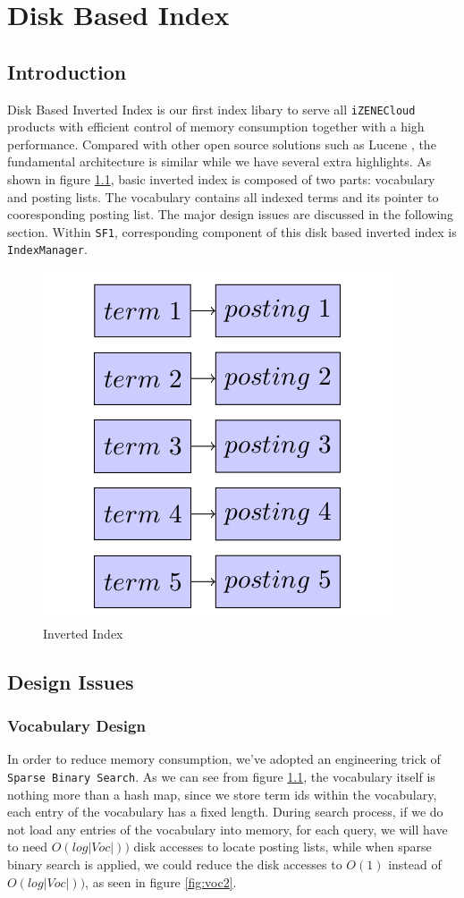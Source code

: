 \chapter{Disk Based Index}
\section{Introduction}
Disk Based Inverted Index is our first index libary to serve all \texttt{iZENECloud} products with efficient control of memory consumption together with a high performance. Compared
with other open source solutions such as Lucene \cite{lucene}, the fundamental architecture is similar while we have several extra highlights. As shown in figure \ref{fig:voc1}, basic
inverted index is composed of two parts: vocabulary and posting lists. The vocabulary contains all indexed terms and its pointer to cooresponding posting list. The major design issues
are discussed in the following section. Within \texttt{SF1}, corresponding component of this disk based inverted index is \texttt{IndexManager}.
\begin{figure}[htp]
\centering
\centerline{\includegraphics[width=.4\textwidth]{Figures/voc1.png}}
\caption{Inverted Index}\label{fig:voc1}
\end{figure}

\section{Design Issues}
\subsection{Vocabulary Design}
In order to reduce memory consumption, we've adopted an engineering trick of \texttt{Sparse Binary Search}. As we can see from figure \ref{fig:voc1}, the vocabulary itself 
is nothing more than a hash map, since we store term ids within the vocabulary, each entry of the vocabulary has a fixed length. During search process, if we do not load any 
entries of the vocabulary into memory, for each query, we will have to need $O(log|Voc|))$ disk accesses to locate posting lists, while when sparse binary search is applied, 
we could reduce the disk accesses to $O(1)$ instead of $O(log|Voc|))$, as seen in figure \ref{fig:voc2}.

